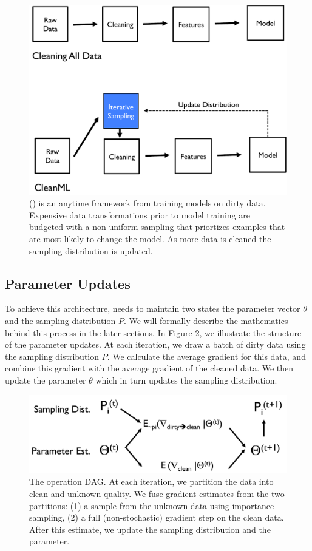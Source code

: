 \begin{figure}[t]
\centering
 \includegraphics[width=\columnwidth]{figs/arch.pdf}
 \caption{\sysfull (\sys) is an anytime framework from training models on dirty data. Expensive data transformations prior to model training are budgeted with a non-uniform sampling that priortizes examples that are most likely to change the model. As more data is cleaned the sampling distribution is updated.  \label{sys-arch}}
\end{figure}

\subsection{Parameter Updates}
To achieve this architecture, \sys needs to maintain two states the parameter vector $\theta$ and the sampling distribution $P$.
We will formally describe the mathematics behind this process in the later sections.
In Figure \ref{param-arch}, we illustrate the structure of the parameter updates.
At each iteration, we draw a batch of dirty data using the sampling distribution $P$.
We calculate the average gradient for this data, and combine this gradient with the average gradient of the cleaned data.
We then update the parameter $\theta$ which in turn updates the sampling distribution.

\begin{figure}[t]
\centering
 \includegraphics[width=\columnwidth]{figs/cmldag.pdf}
 \caption{The \sysfull operation DAG. At each iteration, we partition the data into clean and unknown quality. We fuse gradient estimates from the two partitions: (1) a sample from the unknown data using importance sampling, (2) a full (non-stochastic) gradient step on the clean data. After this estimate, we update the sampling distribution and the parameter.   \label{param-arch}}
\end{figure}


